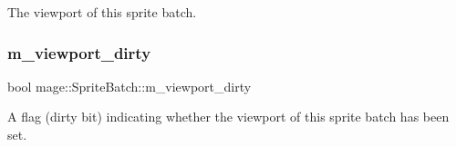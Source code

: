 The viewport of this sprite batch. \hypertarget{classmage_1_1_sprite_batch_a36c02637431746043ed6549c9b622550}{}\label{classmage_1_1_sprite_batch_a36c02637431746043ed6549c9b622550} 
\subsubsection{\texorpdfstring{m\+\_\+viewport\+\_\+dirty}{m\_viewport\_dirty}}
{\footnotesize\ttfamily bool mage\+::\+Sprite\+Batch\+::m\+\_\+viewport\+\_\+dirty\hspace{0.3cm}{\ttfamily [private]}}

A flag (dirty bit) indicating whether the viewport of this sprite batch has been set. 